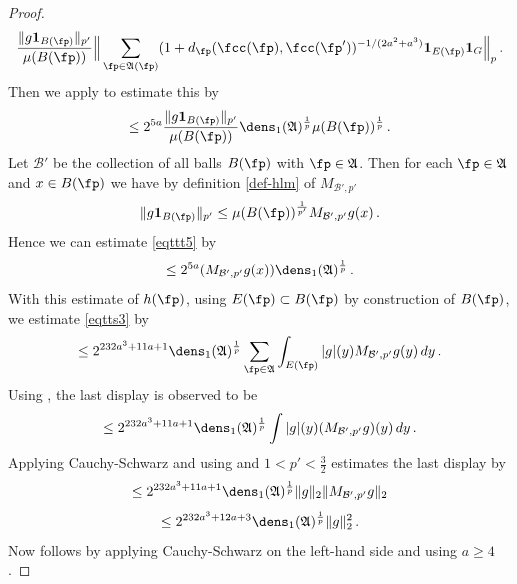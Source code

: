 \begin{proof}
\begin{equation}
    \frac{\|g\mathbf{1}_{B(\fp)}\|_{p'}}{\mu(B(\fp))}
    \Big\|\sum_{\fp\in\mathfrak{A}(\fp)}(1+d_{\fp}(\fcc(\fp), \fcc(\fp'))^{-1/(2a^2+a^3)}\mathbf{1}_{E(\fp)}\mathbf{1}_G\Big\|_{p}\, .
\end{equation}
Then we apply  to estimate this by
\begin{equation}\label{eqttt5}
    \le 2^{5a}
    \frac{\|g\mathbf{1}_{B(\fp)}\|_{p'}}{\mu(B(\fp))}
    \dens_1(\mathfrak{A})^{\frac 1p}\mu(B(\fp))^{\frac 1p}\,.
\end{equation}
Let $\mathcal{B}'$ be the collection of all balls
$B(\fp)$ with $\fp\in \mathfrak{A}$. Then
for each $\fp\in \mathfrak{A}$ and $x\in B(\fp)$ we have by
definition \eqref{def-hlm} of $M_{\mathcal{B}',p'}$
\begin{equation}
    \|g\mathbf{1}_{B(\fp)}\|_{p'}\le
    \mu(B(\fp))^{\frac 1{p'}} M_{\mathcal{B}',p'}g(x) \, .
\end{equation}
Hence we can estimate \eqref{eqttt5} by
\begin{equation}
\label{eqttt5b}
    \le
    2^{5a}
    (M_{\mathcal{B}', p'}g(x))
   \dens_1(\mathfrak{A})^{\frac 1p}\, .
\end{equation}
With this estimate of $h(\fp)$, using $E(\fp)\subset B(\fp)$ by construction of $B(\fp)$, we estimate \eqref{eqtts3} by
 \begin{equation}\label{eqtts4}
 \le 2^{232a^3+11a + 1} { \dens_1(\mathfrak{A})^{\frac 1p}}\sum_{\fp\in \mathfrak{A}}
 \int_{E(\fp)}|g|(y)M_{\mathcal{B}', p'}g(y) \, dy\,.
         \end{equation}
Using , the last display is observed to be
\begin{equation}\label{eqtts4a}
\le 2^{232a^3+11a + 1}
 {\dens_1(\mathfrak{A})^{\frac 1p}} \int |g|(y)(M_{\mathcal{B}', p'}g)(y) \, dy\,.
         \end{equation}
Applying Cauchy-Schwarz and using  and $1<p'<\frac 32$ estimates the last display by
\begin{equation}
    \le 2^{232a^3+11a + 1} \dens_1(\mathfrak{A})^{\frac 1p}
    \|g\|_2 \|M_{\mathcal{B}', p'} g\|_2
\end{equation}
\begin{equation}
    \le 2^{232a^3+12a+3} \dens_1(\mathfrak{A})^{\frac 1p}\|g\|_2 ^2\,.
\end{equation}
Now  follows by applying Cauchy-Schwarz on the left-hand side and using $a\ge 4$.
\end{proof}
